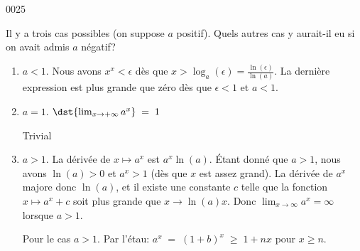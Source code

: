 \begin{corrige}{0025}
\begin{enumerate}
Il y a trois cas possibles (on suppose $a$ positif). Quels autres cas y aurait-il eu si on avait admis $a$ négatif?

\begin{enumerate}
	\item 
	$a< 1$.
	Nous avons $x^x<\epsilon$ dès que $x>\log_a(\epsilon)=\frac{ \ln(\epsilon) }{ \ln(a) }$. La dernière expression est plus grande que zéro dès que $\epsilon<1$ et $a<1$.


	\item
	 $a= 1$.
	$\dst{\lim_{x\rightarrow +\infty} a^x}  \;= \;1$ 

	Trivial

	\item
	 $a> 1$. La dérivée de $x\mapsto a^x$ est $a^x\ln(a)$. Étant donné que $a>1$, nous avons $\ln(a)>0$ et $a^x>1$ (dès que $x$ est assez grand). La dérivée de $a^x$ majore donc $\ln(a)$, et il existe une constante $c$ telle que  la fonction $x\mapsto a^x+c$ soit plus grande que $x\to \ln(a)x$. Donc $\lim_{x\to\infty}a^x=\infty$ lorsque $a>1$.

\begin{alternative}
	Pour le cas $a>1$. Par l'étau: $a^x \; = \; (1+b)^x \; \geq \; 1+nx$ pour $x\geq n$. 
\end{alternative}

\end{enumerate}
\end{enumerate}


\end{corrige}
